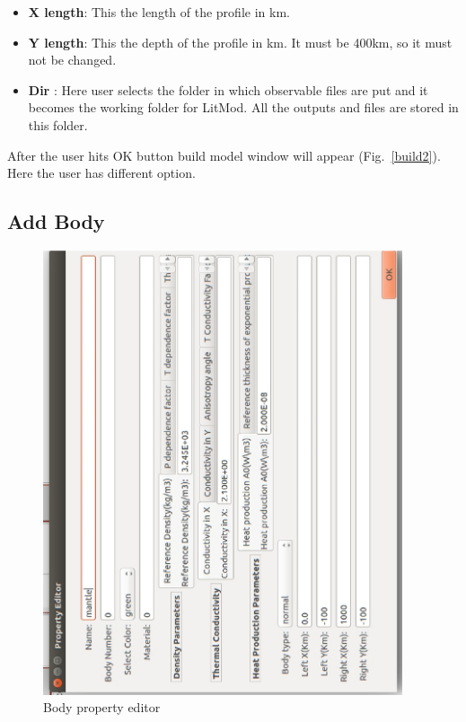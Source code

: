 \documentclass[12pt]{article}
\begin{document}
\begin{itemize}
\item \textbf{X length}: This the length of the profile in km.
\item \textbf{Y length}: This the depth of the profile in km. It must be 400km, so it must not be changed.
\item \textbf{Dir} : Here user selects the folder in which observable files are put and it becomes the working folder for LitMod. All the outputs and files are stored in this folder.
\end{itemize}
After the user hits OK button build model window will appear (Fig.~\ref{build2}). Here the user has different option.

\subsection{Add Body}
\begin{figure}
\centering \includegraphics[width=25pc,angle=-90]{./build_propety.eps}
\caption{Body property editor}
\label{body_property}
\end{figure}
\end{document}
